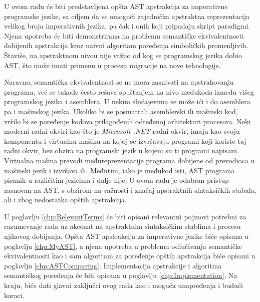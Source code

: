 U ovom radu će biti predstavljena opšta AST apstrakcija za imperativne programske jezike, sa ciljem da se omogući zajednička apstraktna reprezentacija velikog broja imperativnih jezika, pa čak i onih koji pripadaju skript paradigmi. Njena upotreba će biti demonstrirana na problemu semantičke ekvivalentnosti dobijenih apstrakcija kroz naivni algoritam poređenja simboličkih promenljivih. Štaviše, na apstraktnom nivou nije važno od kog se programskog jezika dobio AST, što može imati primenu u procesu migracije na nove tehnologije.

Naravno, semantička ekvivalentnost se ne mora zasnivati na apstrahovanju programa, već se takođe često rešava spuštanjem na nivo međukoda između višeg programskog jezika i asemblera. U nekim slučajevima se može ići i do asemblera pa i mašinskog jezika. Ukoliko bi se posmatrali asemblerski ili mašinski kod, vršilo bi se poređenje kodova prilagođenih određenoj arhitekturi procesora. Neki moderni radni okviri kao što je \emph{Microsoft .NET} radni okvir, imaju kao svoju komponentu i virtualnu mašinu na kojoj se izvršavaju programi koji koriste taj radni okvir, bez obzira na programski jezik u kojem su ti programi napisani. Virtualna mašina prevodi međureprezentacije  programa dobijene od prevodioca u mašinski jezik i izvršava ih. Međutim, iako je međukod isti, AST programa pisanih u različitim jezicima i dalje nije. U ovom radu je odabran pristup zasnovan na AST, s obzirom na važnosti i značaj apstraktnih sintaksičkih stabala, ali i zbog nedostatka opštih apstrakcija.

U poglavlju \ref{chp:RelevantTerms} će biti opisani relevantni pojmovi potrebni za razumevanje rada uz akcenat na apstraktnim sintaksičkim stablima i procesu njihovog dobijanja. Opšta AST apstrakcija za imperativne jezike biće opisana u poglavlju \ref{chp:MyAST}, a njena upotreba u problemu odlučivanja semantičke ekvivalentnosti kao i sam algoritam za poređenje opštih apstrakcija biće opisani u poglavlju \ref{chp:ASTComparing}. Implementacija apstrakcije i algoritma semantičkog poređenja će biti opisana u poglavlju \ref{chp:Implementation}. Na kraju, biće dati glavni zaključci ovog rada kao i moguća unapređenja i budući koraci. 
